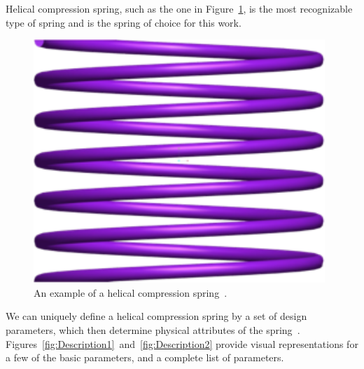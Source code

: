 \documentclass[10pt]{article}
\begin{document}
Helical compression spring, such as the one in Figure~\ref{fig:Spring}, is the most recognizable type of spring and is the spring of choice for this work. 
		\begin{figure}[H]
		 \begin{center}\includegraphics[scale=.2]{Spring.png}\end{center}
		 \caption{An example of a helical compression spring~\cite{Massad2015}.}
		 \label{fig:Spring}
		 \end{figure}
We can uniquely define a helical compression spring by a set of design parameters, which then determine physical attributes of the spring~\cite{Massad2015}. Figures~\ref{fig:Description1}~and~\ref{fig:Description2} provide visual representations for a few of the basic parameters, and a complete list of parameters. 		 
\end{document}
